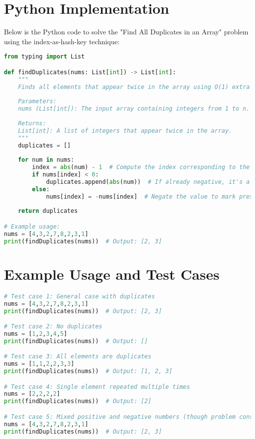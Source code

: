 \section*{Python Implementation}

Below is the Python code to solve the "Find All Duplicates in an Array" problem using the index-as-hash-key technique:

\begin{fullwidth}
\begin{lstlisting}[language=Python]
from typing import List

def findDuplicates(nums: List[int]) -> List[int]:
    """
    Finds all elements that appear twice in the array using O(1) extra space.
    
    Parameters:
    nums (List[int]): The input array containing integers from 1 to n.
    
    Returns:
    List[int]: A list of integers that appear twice in the array.
    """
    duplicates = []
    
    for num in nums:
        index = abs(num) - 1  # Compute the index corresponding to the current number
        if nums[index] < 0:
            duplicates.append(abs(num))  # If already negative, it's a duplicate
        else:
            nums[index] = -nums[index]  # Negate the value to mark presence
    
    return duplicates

# Example usage:
nums = [4,3,2,7,8,2,3,1]
print(findDuplicates(nums))  # Output: [2, 3]
\end{lstlisting}
\end{fullwidth}

\section*{Example Usage and Test Cases}

\begin{lstlisting}[language=Python]
# Test case 1: General case with duplicates
nums = [4,3,2,7,8,2,3,1]
print(findDuplicates(nums))  # Output: [2, 3]

# Test case 2: No duplicates
nums = [1,2,3,4,5]
print(findDuplicates(nums))  # Output: []

# Test case 3: All elements are duplicates
nums = [1,1,2,2,3,3]
print(findDuplicates(nums))  # Output: [1, 2, 3]

# Test case 4: Single element repeated multiple times
nums = [2,2,2,2]
print(findDuplicates(nums))  # Output: [2]

# Test case 5: Mixed positive and negative numbers (though problem constraints specify positive)
nums = [4,3,2,7,8,2,3,1]
print(findDuplicates(nums))  # Output: [2, 3]
\end{lstlisting}

